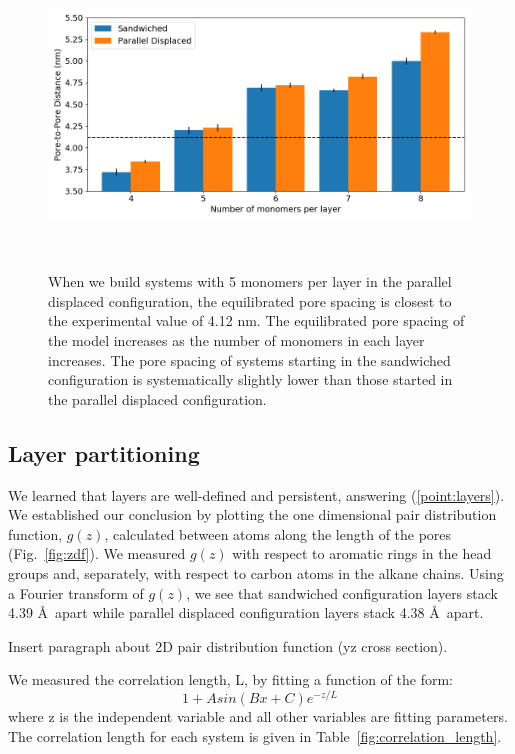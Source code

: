 \documentclass{article}
\newcommand{\angstrom}{\textup{\AA}}
\begin{document}
  \begin{figure}
	\centering
	\includegraphics[width=\linewidth]{p2p.png}
	\caption{When we build systems with 5 monomers per layer in the
		parallel displaced configuration, the equilibrated pore spacing is closest to
		the experimental value of 4.12 nm. The equilibrated pore spacing of the model
		increases as the number of monomers in each layer increases. The pore spacing
		of systems starting in the sandwiched configuration is systematically slightly
		lower than those started in the parallel displaced configuration.}~\label{fig:p2p}
  \end{figure}  

  \subsection{Layer partitioning}

  We learned that layers are well-defined and persistent, answering
  (\ref{point:layers}). We established our conclusion by plotting the one dimensional pair
  distribution function, $g(z)$, calculated between atoms along the length of the
  pores (Fig.~\ref{fig:zdf}). We measured $g(z)$ with respect to aromatic rings in
  the head groups and, separately, with respect to carbon atoms in the alkane
  chains. Using a Fourier transform of $g(z)$, we see that sandwiched
  configuration layers stack 4.39 \angstrom~apart while parallel displaced
  configuration layers stack 4.38 \angstrom~apart.

  Insert paragraph about 2D pair distribution function (yz cross section). 

  We measured the correlation length, L, by fitting a function of the form:
  $$1 + Asin(Bx + C)e^{-z/L}$$ where z is the independent variable and all
  other variables are fitting parameters. The correlation length for each
  system is given in Table~\ref{fig:correlation_length}.
\end{document}
